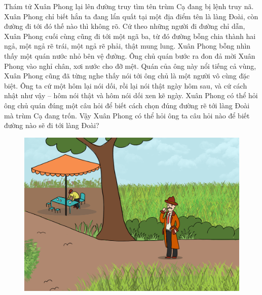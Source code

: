 \begin{multicols}{2}
	Thám tử Xuân Phong lại lên đường truy tìm tên trùm Cạ đang bị lệnh truy nã. Xuân Phong chỉ biết hắn ta đang lẩn quất tại một địa điểm tên là làng Đoài, còn đường đi tới đó thế nào thì không rõ. Cứ theo những người đi đường chỉ dẫn, Xuân Phong cuối cùng cũng đi tới một ngã ba, từ đó đường bỗng chia thành hai ngả, một ngả rẽ trái, một ngả rẽ phải, thật mung lung. Xuân Phong bỗng nhìn thấy một quán nước nhỏ bên vệ đường. Ông chủ quán bước ra đon đả mời Xuân Phong vào nghỉ chân, xơi nước cho đỡ mệt. Quán của ông này nổi tiếng cả vùng, Xuân Phong cũng đã từng nghe thấy nói tới ông chủ là một người vô cùng đặc biệt. Ông ta cứ một hôm lại nói dối, rồi lại nói thật ngày hôm sau, và cứ cách nhật như vậy -- hôm nói thật và hôm nói dối xen kẽ ngày. Xuân Phong có thể hỏi ông chủ quán đúng một câu hỏi để biết cách chọn đúng đường rẽ tới làng Đoài mà trùm Cạ đang trốn. Vậy Xuân Phong có thể hỏi ông ta câu hỏi nào để biết đường nào sẽ đi tới làng Đoài?
	\begin{figure}[H]
		\vspace*{-5pt}
		\centering
		\captionsetup{labelformat= empty, justification=centering}
		\includegraphics[width= 1\linewidth]{xp}
		\vspace*{-10pt}
	\end{figure}
\end{multicols}
%
